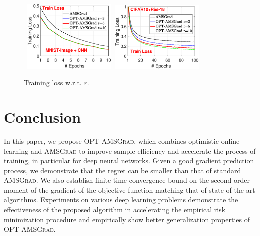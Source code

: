\documentclass[twoside]{article}
\begin{document}
\begin{figure}[ht]
\mbox{\hspace{-0.1in}
\includegraphics[width=1.75in]{new_figure/new_mnist_img_figure/mnist_img_train_loss_r3510_2.eps}\hspace{-0.1in}
\includegraphics[width=1.75in]{new_figure/cifar10_train_loss_r3510.eps}
}
\vspace{-0.1in}
\caption{Training loss w.r.t. $r$.}\label{fig:compare}\vspace{-0.05in}
\end{figure}


\vspace{-0.1in}
\section{Conclusion}
\vspace{-0.05in}

In this paper, we propose \textsc{OPT-AMSGrad}, which combines optimistic online learning and \textsc{AMSGrad} to improve sample efficiency and
accelerate the process of training, in particular for deep neural networks. 
Given a good gradient prediction process, we demonstrate that the regret can be smaller than that of standard \textsc{AMSGrad}.
We also establish finite-time convergence bound on the second order moment of the gradient of the objective function matching that of state-of-the-art algorithms.
Experiments on various deep learning problems demonstrate the effectiveness of the proposed algorithm in accelerating the empirical risk minimization procedure and empirically show better generalization properties of \textsc{OPT-AMSGrad}.
\end{document}
